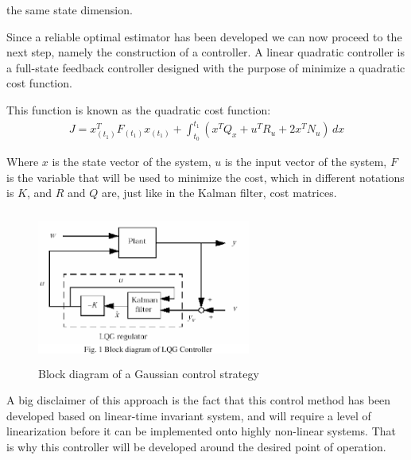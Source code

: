 \documentclass[twocolumn,showpacs,
    nofootinbib,aps,superscriptaddress,
    eqsecnum,prd,showkeys,10pt,floatfix]{revtex4}
\begin{document}
the same state dimension.
\par
Since a reliable optimal estimator has been developed we can now proceed to the
next step, namely the construction of a controller. A linear quadratic controller
is a full-state feedback controller designed with the purpose of minimize a quadratic cost function.
\par
This function is known as the quadratic cost function:
\begin{align}
    J=x^T_{(t_1)}F_{(t_1)}x_{(t_1)}+\int_{t_0}^{t_1} {(x^{T}Q_{x}+u^{T}R_{u}+2x^{T}N_{u})} \,dx
\end{align}
\par
Where $x$ is the state vector of the system, $u$ is the input vector of the system,
$F$ is the variable that will be used to minimize the cost, which in different
notations is $K$, and $R$ and $Q$ are, just like in the Kalman filter, cost matrices.
\par
\begin{figure}
    \centering
    \includegraphics[width=70mm,height=50mm]{GAUSS.png}
    \caption[]{Block diagram of a Gaussian control strategy}\label{Gauss}
\end{figure}
\par
A big disclaimer of this approach is the fact that this control method
has been developed based on linear-time invariant system, and will require a level of linearization before it can be implemented onto highly non-linear systems. That is why this controller will be developed around the desired point of operation.
\end{document}
